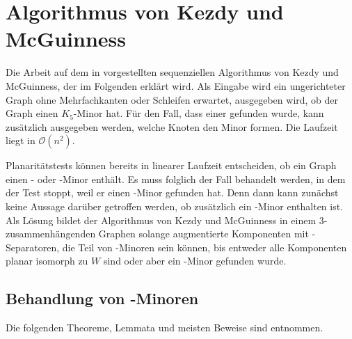 \chapter{Algorithmus von Kezdy und McGuinness}
\label{cha:algorithmuskezdymcguinness}

Die Arbeit auf dem in \cite{KeM92} vorgestellten sequenziellen Algorithmus von Kezdy und McGuinness, der im Folgenden erklärt wird.
Als Eingabe wird ein ungerichteter Graph ohne Mehrfachkanten oder Schleifen erwartet, ausgegeben wird, ob der Graph einen $K_5$-Minor hat.
Für den Fall, dass einer gefunden wurde, kann zusätzlich ausgegeben werden, welche Knoten den Minor formen.
Die Laufzeit liegt in $\mathcal{O}(n^2)$.

Planaritätstests können bereits in linearer Laufzeit entscheiden, ob ein Graph einen \kf- oder \kdd-Minor enthält\cite{BoM04}.
Es muss folglich der Fall behandelt werden, in dem der Test stoppt, weil er einen \kdd-Minor gefunden hat.
Denn dann kann zunächst keine Aussage darüber getroffen werden, ob zusätzlich ein \kf-Minor enthalten ist.
Als Lösung bildet der Algorithmus von Kezdy und McGuinness in einem $3$-zusammenhängenden Graphen solange augmentierte Komponenten mit \dd-Separatoren, die Teil von \kdd-Minoren sein können, bis entweder alle Komponenten planar \bzw isomorph zu $W$ sind oder aber ein \kf-Minor gefunden wurde.


\section{Behandlung von \kdd-Minoren}
\label{sec:behandlung_von_kdd_minoren}

Die folgenden Theoreme, Lemmata und meisten Beweise sind \cite{KeM92} entnommen.


